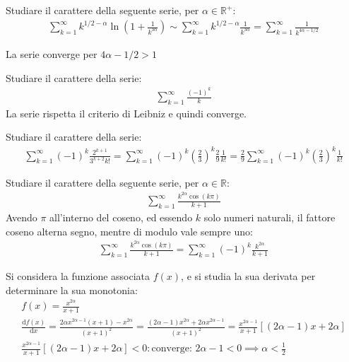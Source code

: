 \documentclass{article}
\numberwithin{equation}{subsection}
\begin{document}
Studiare il carattere della seguente serie, per $\alpha\in\mathbb{R}^+$:
\begin{gather*}
    \displaystyle\sum_{k=1}^\infty k^{1/2-\alpha}\ln\left(1+\frac{1}{k^{3\alpha}}\right)\sim\sum_{k=1}^\infty k^{1/2-\alpha}\frac{1}{k^{3\alpha}}=\sum_{k=1}^\infty\frac{1}{k^{4\alpha-1/2}}
\end{gather*}

La serie converge per $4\alpha-1/2>1$




Studiare il carattere della serie:
\begin{gather*}
    \displaystyle\sum_{k=1}^\infty\frac{(-1)^k}{k}
\end{gather*}
La serie rispetta il criterio di Leibniz e quindi converge. 


Studiare il carattere della serie:
\begin{gather*}
    \displaystyle\sum_{k=1}^{\infty}(-1)^k\frac{2^{k+1}}{3^{k+2}k!}=
    \sum_{k=1}^\infty(-1)^k\left(\frac{2}{3}\right)^k\frac{2}{9}\frac{1}{k!}=\frac{2}{9}\sum_{k=1}^\infty(-1)^k\left(\frac{2}{3}\right)^k\frac{1}{k!}
\end{gather*}



Studiare il carattere della seguente serie, per $\alpha\in\mathbb{R}$:
\begin{gather*}
    \displaystyle\sum_{k=1}^\infty\frac{k^{2\alpha}\cos(k\pi)}{k+1}
\end{gather*}
Avendo $\pi$ all'interno del coseno, ed essendo $k$ solo numeri naturali, il fattore coseno alterna segno, mentre di modulo vale sempre uno:
\begin{gather*}
    \displaystyle\sum_{k=1}^\infty\frac{k^{2\alpha}\cos(k\pi)}{k+1}=
    \sum_{k=1}^\infty(-1)^k\frac{k^{2\alpha}}{k+1}
\end{gather*}

Si considera la funzione associata $f(x)$, e si studia la sua derivata per determinare la sua monotonia:
\begin{gather*}
    f(x)=\displaystyle\frac{x^{2\alpha}}{x+1}\\
    \displaystyle\frac{\mathrm{d}f(x)}{\mathrm{d}x}=\frac{2\alpha x^{2\alpha-1}(x+1)-x^{2\alpha}}{(x+1)^2}=
    \frac{(2\alpha-1)x^{2\alpha}+2\alpha x^{2\alpha-1}}{(x+1)^2}=\frac{x^{2\alpha-1}}{x+1}\left[(2\alpha-1)x+2\alpha\right]\\\frac{x^{2\alpha-1}}{x+1}\left[(2\alpha-1)x+2\alpha\right]<0:\mbox{converge}:\,2\alpha-1<0\implies\alpha<\frac{1}{2}
\end{gather*}
\end{document}

